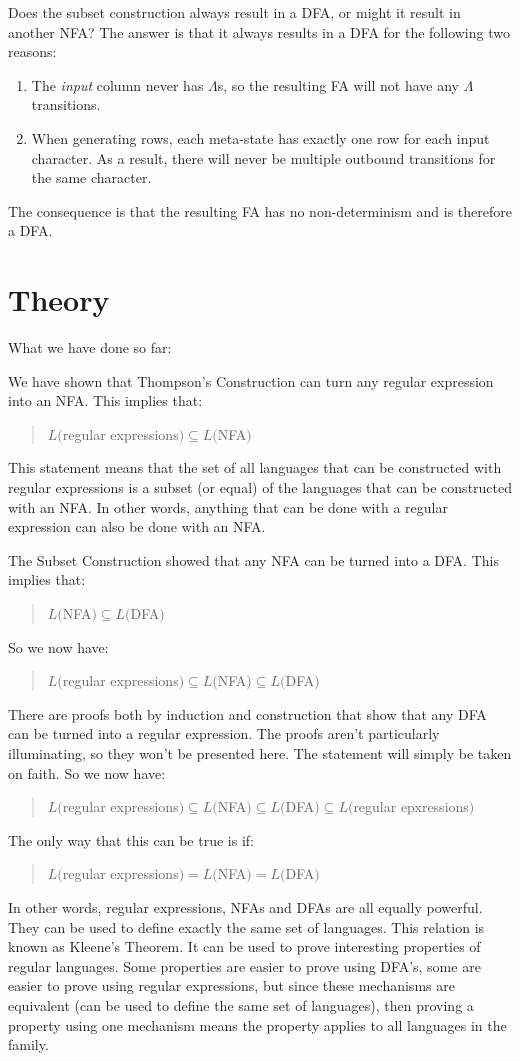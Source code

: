 \documentclass[letterpaper,12pt,openany,reqno]{book}%
\begin{document}
Does the subset construction always result in a DFA, or might it result in another NFA? The answer is that it always results in a DFA for the following two reasons:
\begin{enumerate}
\item The \emph{input} column never has $\Lambda$s, so the resulting FA will not have any $\Lambda$ transitions.
\item When generating rows, each meta-state has exactly one row for each input character. As a result, there will never be multiple outbound transitions for the same character.
\end{enumerate}
The consequence is that the resulting FA has no non-determinism and is therefore a DFA.

\chapter{Theory}
\label{C.RL.theory}

What we have done so far:

We have shown that Thompson's Construction can turn any regular expression into an NFA. This implies that:
\begin{quote}
$L($regular expressions$) \subseteq L($NFA$)$
\end{quote}
This statement means that the set of all languages that can be constructed with regular expressions is a subset (or equal) of the languages that can be constructed with an NFA. In other words, anything that can be done with a regular expression can also be done with an NFA.

The Subset Construction showed that any NFA can be turned into a DFA. This implies that:
\begin{quote}
$L($NFA$) \subseteq L($DFA$)$
\end{quote}
So we now have:
\begin{quote}
$L($regular expressions$) \subseteq L($NFA$) \subseteq L($DFA$)$
\end{quote}

There are proofs both by induction and construction that show that any DFA can be turned into a regular expression. The proofs aren't particularly illuminating, so they won't be presented here. The statement will simply be taken on faith. So we now have:

\begin{quote}
$L($regular expressions$) \subseteq L($NFA$) \subseteq L($DFA$) \subseteq L($regular epxressions$)$
\end{quote}
The only way that this can be true is if:
\begin{quote}
$L($regular expressions$) = L($NFA$) = L($DFA$)$
\end{quote}
In other words, regular expressions, NFAs and DFAs are all equally powerful. They can be used to define exactly the same set of languages. This relation is known as Kleene's Theorem. It can be used to prove interesting properties of regular languages. Some properties are easier to prove using DFA's, some are easier to prove using regular expressions, but since these mechanisms are equivalent (can be used to define the same set of languages), then proving a property using one mechanism means the property applies to all languages in the family.
\end{document}
